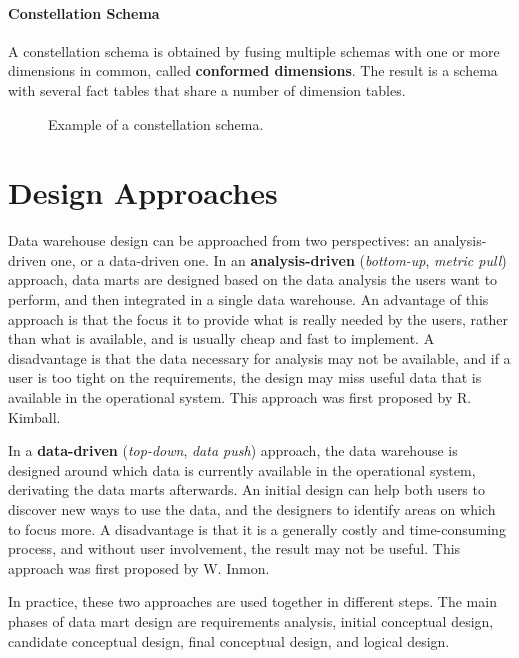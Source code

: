\paragraph{Constellation Schema} A constellation schema is obtained by fusing multiple schemas with one or more dimensions in common, called \textbf{conformed dimensions}. The result is a schema with several fact tables that share a number of dimension tables.
\begin{figure}[ht]
    \centering
    
    \caption{Example of a constellation schema.}
\end{figure}

\section{Design Approaches}

Data warehouse design can be approached from two perspectives: an analysis-driven one, or a data-driven one. In an \textbf{analysis-driven} (\textit{bottom-up}, \textit{metric pull}) approach, data marts are designed based on the data analysis the users want to perform, and then integrated in a single data warehouse. An advantage of this approach is that the focus it to provide what is really needed by the users, rather than what is available, and is usually cheap and fast to implement. A disadvantage is that the data necessary for analysis may not be available, and if a user is too tight on the requirements, the design may miss useful data that is available in the operational system. This approach was first proposed by R. Kimball.

In a \textbf{data-driven} (\textit{top-down}, \textit{data push}) approach, the data warehouse is designed around which data is currently available in the operational system, derivating the data marts afterwards. An initial design can help both users to discover new ways to use the data, and the designers to identify areas on which to focus more. A disadvantage is that it is a generally costly and time-consuming process, and without user involvement, the result may not be useful. This approach was first proposed by W. Inmon.

In practice, these two approaches are used together in different steps. The main phases of data mart design are requirements analysis, initial conceptual design, candidate conceptual design, final conceptual design, and logical design.

